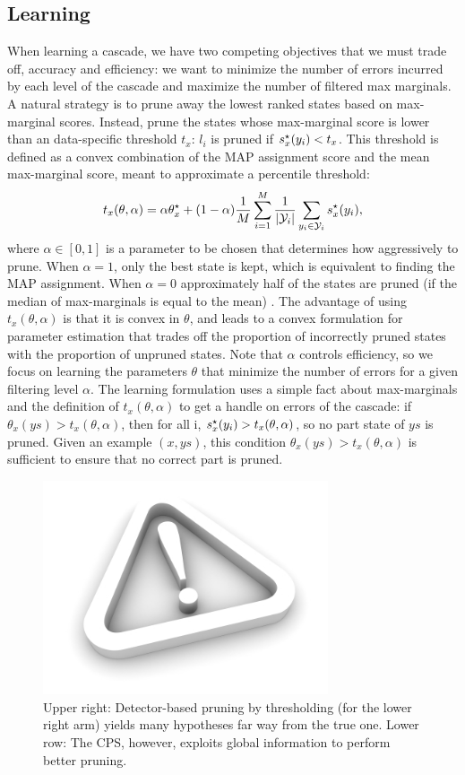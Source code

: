 \subsection{Learning}
When learning a cascade, we have two competing objectives that we must trade off,
accuracy and efficiency: we want to minimize the number of errors incurred by each
level of the cascade  and maximize the number of filtered max marginals.  A natural strategy is to prune away the lowest ranked states based on max-marginal scores. Instead, \cite{cascades} prune the states whose max-marginal score is lower than an data-specific threshold $t_x$: $l_i$ is pruned if $s^\star_x(y_i) < t_x$.  This threshold is defined as a convex combination of the MAP assignment score and the mean max-marginal score, meant to approximate a percentile threshold: $$t_x(\theta,\alpha) = \alpha \theta^\star_x + (1-\alpha)\frac{1}{M}\sum_{i=1}^M\frac{1}{|\mathcal{Y}_i|}\sum_{y_i \in \mathcal{Y}_i} s^\star_x(y_i),$$ where $\alpha\in[0,1]$ is a parameter to be chosen that determines how aggressively to prune. When $\alpha = 1$, only the best state is kept, which is equivalent to finding the MAP assignment.  When $\alpha = 0$ approximately half of the states are pruned (if the median of max-marginals is equal to the mean) .  The advantage of using  $t_x(\theta,\alpha)$ is that it is convex in $\theta$, and leads to a convex formulation for parameter estimation that trades off the proportion of incorrectly pruned states with the proportion of unpruned states.
Note that  $\alpha$ controls efficiency, so we focus on learning the parameters $\theta$ that 
minimize the number of errors for a given filtering level $\alpha$.   The learning formulation uses a simple fact about max-marginals and the definition of $t_x(\theta,\alpha)$
to get a handle on errors of the cascade:
if $\theta_x(ys) > t_x(\theta,\alpha)$, then for all i, $s^\star_x(y_i) >  t_x(\theta,\alpha)$, so no part state of $ys$ is pruned.   Given an example $(x,ys)$,
this condition $\theta_x(ys) > t_x(\theta,\alpha)$ is sufficient to ensure that no correct part is pruned.
\begin{figure}[t]
\begin{center}
\includegraphics[width=0.75\textwidth]{figs/empty.jpg}
\caption[SHORT TITLE]{Upper right: Detector-based pruning by thresholding (for 
the lower right arm) yields many hypotheses far way from the true one. Lower 
row: The CPS, however, exploits global information to perform better pruning.}
\label{fig:cascade_pruning}
\end{center}
\end{figure}
